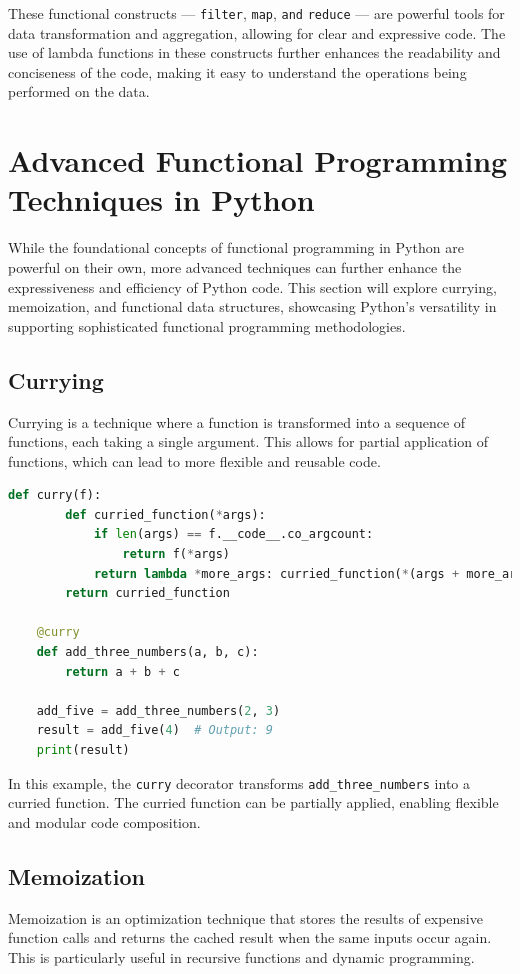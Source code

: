 \documentclass[a4paper]{article}
\begin{document}
These functional constructs — \texttt{filter}, \texttt{map}, \texttt{and} \texttt{reduce} — are powerful tools for data transformation and aggregation, allowing for clear and expressive code. The use of lambda functions in these constructs further enhances the readability and conciseness of the code, making it easy to understand the operations being performed on the data.

\newpage
\section{Advanced Functional Programming Techniques in Python}
While the foundational concepts of functional programming in Python are powerful on their own, more advanced techniques can further enhance the expressiveness and efficiency of Python code. This section will explore currying, memoization, and functional data structures, showcasing Python's versatility in supporting sophisticated functional programming methodologies.

\subsection{Currying}
Currying is a technique where a function is transformed into a sequence of functions, each taking a single argument. This allows for partial application of functions, which can lead to more flexible and reusable code.

\begin{lstlisting}[language=Python, caption=Currying Example]
    def curry(f):
        def curried_function(*args):
            if len(args) == f.__code__.co_argcount:
                return f(*args)
            return lambda *more_args: curried_function(*(args + more_args))
        return curried_function

    @curry
    def add_three_numbers(a, b, c):
        return a + b + c

    add_five = add_three_numbers(2, 3)
    result = add_five(4)  # Output: 9
    print(result)
\end{lstlisting}

In this example, the \texttt{curry} decorator transforms \texttt{add\_three\_numbers} into a curried function. The curried function can be partially applied, enabling flexible and modular code composition.

\subsection{Memoization}
Memoization is an optimization technique that stores the results of expensive function calls and returns the cached result when the same inputs occur again. This is particularly useful in recursive functions and dynamic programming.
\end{document}
